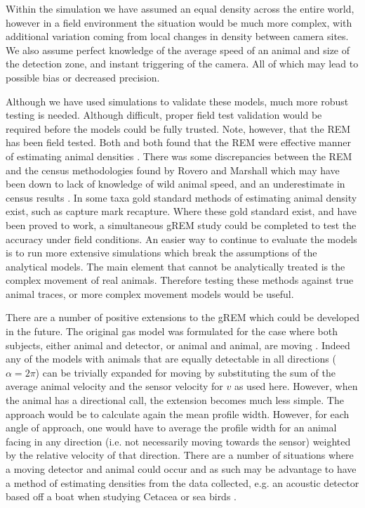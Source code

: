 \documentclass[a4paper,10pt,reqno,oneside]{amsart}
\begin{document}
Within the simulation we have assumed an equal density across the entire world, however in a field environment the situation would be much more complex, with additional variation coming from local changes in density between camera sites. We also assume perfect knowledge of the average speed of an animal and size of the detection zone, and instant triggering of the camera. All of which may lead to possible bias or decreased precision.    

Although we have used simulations to validate these models, much more robust testing is needed. Although difficult, proper field test validation would be required before the models could be fully trusted. Note, however, that the REM \citep{rowcliffe2008estimating} has been field tested. Both \citet{rowcliffe2008estimating} and \citet{zero2013monitoring} both found that the REM were effective manner of estimating animal densities \citep{rowcliffe2008estimating, zero2013monitoring}. There was some discrepancies between the REM and the census methodologies found by Rovero and Marshall which may have been down to lack of knowledge of wild animal speed, and an underestimate in census results \citep{rovero2009camera}. In some taxa gold standard methods of estimating animal density exist, such as capture mark recapture. Where these gold standard exist, and have been proved to work, a simultaneous gREM study could be completed to test the accuracy under field conditions. An easier way to continue to evaluate the models is to run more extensive simulations which break the assumptions of the analytical models. The main element that cannot be analytically treated is the complex movement of real animals. Therefore testing these methods against true animal traces, or more complex movement models would be useful.


There are a number of positive extensions to the gREM which could be developed in the future. The original gas model was formulated for the case where both subjects, either animal and detector, or animal and animal, are moving \citep{Hutchinson_Waser_2007}. Indeed any of the models with animals that are equally detectable in all directions ($\alpha = 2\pi$) can be trivially expanded for moving by substituting the sum of the average animal velocity and the sensor velocity for $v$ as used here. However, when the animal has a directional call, the extension becomes much less simple. The approach would be to calculate again the mean profile width. However, for each angle of approach, one would have to average the profile width for an animal facing in any direction (i.e. not necessarily moving towards the sensor) weighted by the relative velocity of that direction. There are a number of situations where a moving detector and animal could occur and as such may be advantage to have a method of estimating densities from the data collected, e.g. an acoustic detector based off a boat when studying Cetacea or sea birds \citep{yack2013passive}.
\end{document}
